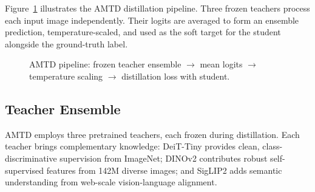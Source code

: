 \documentclass[journal]{IEEEtran}
\begin{document}
Figure~\ref{fig:pipeline} illustrates the AMTD distillation pipeline. Three frozen teachers
process each input image independently. Their logits are averaged to form an ensemble prediction,
temperature-scaled, and used as the soft target for the student alongside the ground-truth label.

\begin{figure}[!t]
\centering
\vspace{2mm}
\caption{AMTD pipeline: frozen teacher ensemble $\to$ mean logits $\to$ temperature scaling
$\to$ distillation loss with student.}
\label{fig:pipeline}
\end{figure}

\subsection{Teacher Ensemble}

AMTD employs three pretrained teachers, each frozen during distillation. Each teacher brings
complementary knowledge: DeiT-Tiny provides clean, class-discriminative supervision from ImageNet;
DINOv2 contributes robust self-supervised features from 142M diverse images; and SigLIP2 adds
semantic understanding from web-scale vision-language alignment.
\end{document}
